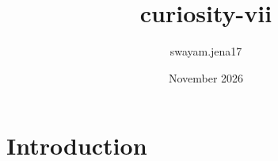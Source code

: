 \documentclass{book}
\title{curiosity-vii}
\author{swayam.jena17 }
\date{November 2026}
\begin{document}
\maketitle

\section{Introduction}
\end{document}
